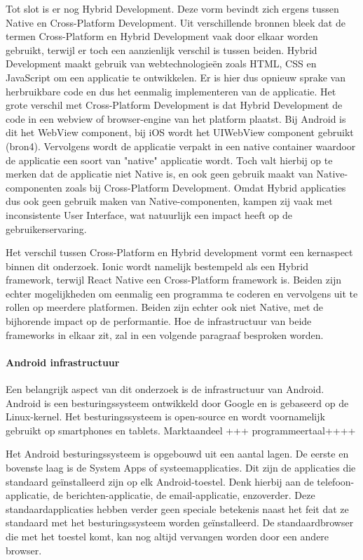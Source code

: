 Tot slot is er nog Hybrid Development. Deze vorm bevindt zich ergens tussen Native en Cross-Platform Development. Uit verschillende bronnen bleek dat de termen Cross-Platform en Hybrid Development vaak door elkaar worden gebruikt, terwijl er toch een aanzienlijk verschil is tussen beiden. Hybrid Development maakt gebruik van webtechnologieën zoals HTML, CSS en JavaScript om een applicatie te ontwikkelen. Er is hier dus opnieuw sprake van herbruikbare code en dus het eenmalig implementeren van de applicatie. Het grote verschil met Cross-Platform Development is dat Hybrid Development de code in een webview of browser-engine van het platform plaatst. Bij Android is dit het WebView component, bij iOS wordt het UIWebView component gebruikt (bron4). Vervolgens wordt de applicatie verpakt in een native container waardoor de applicatie een soort van "native" applicatie wordt. Toch valt hierbij op te merken dat de applicatie niet Native is, en ook geen gebruik maakt van Native-componenten zoals bij Cross-Platform Development. Omdat Hybrid applicaties dus ook geen gebruik maken van Native-componenten, kampen zij vaak met inconsistente User Interface, wat natuurlijk een impact heeft op de gebruikerservaring.

Het verschil tussen Cross-Platform en Hybrid development vormt een kernaspect binnen dit onderzoek. Ionic wordt namelijk bestempeld als een Hybrid framework, terwijl React Native een Cross-Platform framework is. Beiden zijn echter mogelijkheden om eenmalig een programma te coderen en vervolgens uit te rollen op meerdere platformen. Beiden zijn echter ook niet Native, met de bijhorende impact op de performantie. Hoe de infrastructuur van beide frameworks in elkaar zit, zal in een volgende paragraaf besproken worden.


\paragraph{Android infrastructuur}

Een belangrijk aspect van dit onderzoek is de infrastructuur van Android. Android is een besturingssysteem ontwikkeld door Google en is gebaseerd op de Linux-kernel. Het besturingssysteem is open-source en wordt voornamelijk gebruikt op smartphones en tablets. Marktaandeel +++
programmeertaal++++

Het Android besturingssysteem is opgebouwd uit een aantal lagen. De eerste en bovenste laag is de System Apps of systeemapplicaties. Dit zijn de applicaties die standaard geïnstalleerd zijn op elk Android-toestel. Denk hierbij aan de telefoon-applicatie, de berichten-applicatie, de email-applicatie, enzoverder. Deze standaardapplicaties hebben verder geen speciale betekenis naast het feit dat ze standaard met het besturingssysteem worden geïnstalleerd. De standaardbrowser die met het toestel komt, kan nog altijd vervangen worden door een andere browser.

